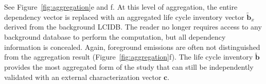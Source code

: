 See Figure~\ref{fig:aggregation}e and f. At this level of aggregation, the entire dependency vector is replaced with an aggregated life cycle inventory vector $\tilde{\mathbf{b}}_x$ derived from the background LCIDB.  The reader no longer requires access to any background database to perform the computation, but all dependency information is concealed.  Again, foreground emissions are often not distinguished from the aggregation result (Figure~\ref{fig:aggregation}f).  The life cycle inventory $\tilde{\mathbf{b}}$ provides the most aggregated form of the study that can still be independently validated with an external characterization vector $\mathbf{c}$.  

